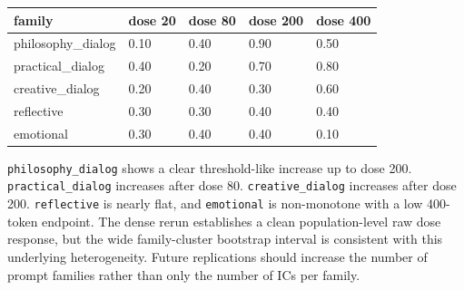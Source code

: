 \documentclass{article}
\theoremstyle{plain}
\theoremstyle{definition}
\begin{document}
\begin{table}[h!]
\centering
\small
\begin{tabularx}{\textwidth}{lYYYY}
\toprule
family & dose 20 & dose 80 & dose 200 & dose 400 \\
\midrule
philosophy\_dialog & 0.10 & 0.40 & 0.90 & 0.50 \\
practical\_dialog & 0.40 & 0.20 & 0.70 & 0.80 \\
creative\_dialog & 0.20 & 0.40 & 0.30 & 0.60 \\
reflective & 0.30 & 0.30 & 0.40 & 0.40 \\
emotional & 0.30 & 0.40 & 0.40 & 0.10 \\
\bottomrule
\end{tabularx}
\end{table}

\texttt{philosophy\_dialog} shows a clear threshold-like increase up to dose 200. \texttt{practical\_dialog} increases after dose 80. \texttt{creative\_dialog} increases after dose 200. \texttt{reflective} is nearly flat, and \texttt{emotional} is non-monotone with a low 400-token endpoint. The dense rerun establishes a clean population-level raw dose response, but the wide family-cluster bootstrap interval is consistent with this underlying heterogeneity. Future replications should increase the number of prompt families rather than only the number of ICs per family.
\end{document}
